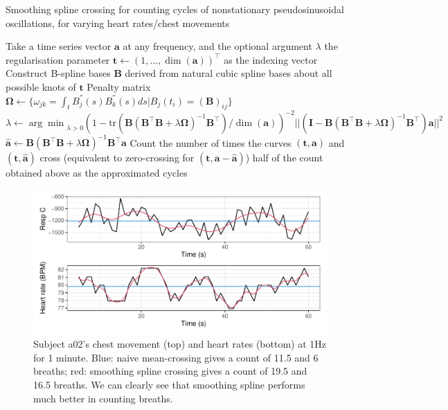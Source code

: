 \documentclass[
]{article}
\begin{document}
\begin{algorithm}
\caption{Smoothing spline crossing for counting cycles of nonstationary pseudosinusoidal oscillations, for varying heart rates/chest movements}
\begin{algorithmic}[1]
\STATE Take a time series vector $\mathbf{a}$ at any frequency, and the optional argument $\lambda$ the regularisation parameter
\STATE $\mathbf{t} \leftarrow (1, ..., \dim(\mathbf{a}))^\top$ as the indexing vector
\STATE Construct B-spline bases $\mathbf{B}$ derived from natural cubic spline bases about all possible knots of $\mathbf{t}$
\STATE Penalty matrix $\boldsymbol{\Omega} \leftarrow \{\omega_{jk} = \int_t {B_j^{''}(s)B_k^{''}(s)}ds | B_j(t_i) = (\mathbf{B})_{ij}\}$
\STATE $\lambda \leftarrow {\arg\min}_{\lambda > 0} (1 - \text{tr}(\mathbf{B}(\mathbf{B}^\top\mathbf{B} + \lambda\boldsymbol{\Omega})^{-1}\mathbf{B}^\top) / \dim(\mathbf{a}))^{-2}||(\mathbf{I} - \mathbf{B}(\mathbf{B}^\top\mathbf{B} + \lambda\boldsymbol{\Omega})^{-1}\mathbf{B}^\top)\mathbf{a}||^2$
\ENDIF
\STATE $\mathbf{\hat{a}} \leftarrow \mathbf{B}(\mathbf{B}^\top\mathbf{B} + \lambda\boldsymbol{\Omega})^{-1}\mathbf{B}^\top\mathbf{a}$
\STATE Count the number of times the curves $(\mathbf{t}, \mathbf{a})$ and $(\mathbf{t}, \mathbf{\hat{a}})$ cross (equivalent to zero-crossing for $(\mathbf{t}, \mathbf{a} - \mathbf{\hat{a}})$)
\RETURN half of the count obtained above as the approximated cycles
\end{algorithmic}
\end{algorithm}

\begin{figure}

{\centering \includegraphics{report_files/figure-latex/sszc-1} 

}

\caption{Subject a02's chest movement (top) and heart rates (bottom) at 1Hz for 1 minute. Blue: naive mean-crossing gives a count of 11.5 and 6 breaths; red: smoothing spline crossing gives a count of 19.5 and 16.5 breaths. We can clearly see that smoothing spline performs much better in counting breaths.}\label{fig:sszc}
\end{figure}
\end{document}
